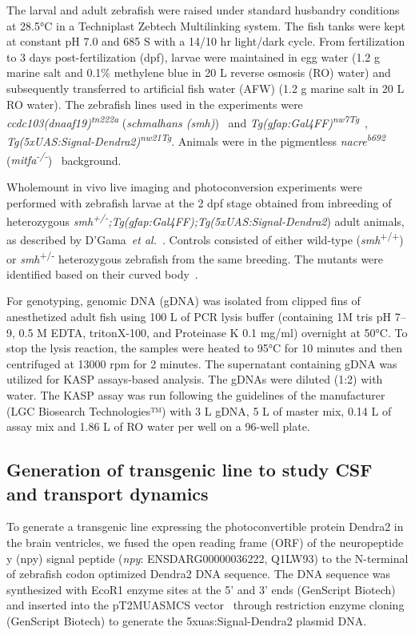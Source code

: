 \documentclass{WileyMSP-template}
\begin{document}
The larval and adult zebrafish were raised under standard husbandry
conditions at 28.5°C in a Techniplast Zebtech Multilinking system.
The fish tanks were kept at constant pH 7.0 and 685 \textmu S with a
14/10 hr light/dark cycle.
From fertilization to 3 days post-fertilization (dpf), larvae were maintained in egg
water (1.2 g marine salt and 0.1\% methylene blue in 20 L reverse osmosis (RO) water)
and subsequently transferred to artificial fish water (AFW)
(1.2 g marine salt in 20 L RO water). The zebrafish lines used in the experiments were
\emph{ccdc103(dnaaf19)\textsuperscript{tn222a}}
(\emph{schmalhans (smh)})~\cite{Jau-NianChen1997Left-rightZebrafish}
and \emph{Tg(gfap:Gal4FF)\textsuperscript{nw7Tg}}~\cite{DiazVerdugo2019Glia-neuronSeizures},
\emph{Tg(5xUAS:Signal-Dendra2)\textsuperscript{nw21Tg}}.
Animals were in the pigmentless \emph{nacre\textsuperscript{b692}}
(\emph{mitfa\textsuperscript{-/-}})~\cite{JamesA.Lister1999NacreFate} background.

Wholemount in vivo live imaging and photoconversion
experiments were performed with zebrafish larvae at the 2 dpf stage obtained from inbreeding of heterozygous
\emph{smh\textsuperscript{+/-};Tg(gfap:Gal4FF);Tg(5xUAS:Signal-Dendra2})
adult animals, as described by D'Gama~\emph{et al.}~\cite{DGama2025MotileBrain}.
Controls consisted of either wild-type (\emph{smh}\textsuperscript{+/+})
or \emph{smh}\textsuperscript{+/-} heterozygous zebrafish from the same breeding.
The mutants were identified based on their curved body~\cite{Jau-NianChen1997Left-rightZebrafish}.

For genotyping, genomic DNA (gDNA) was isolated from clipped fins of anesthetized adult
fish using 100 \textmu L of PCR lysis buffer (containing 1M tris pH 7--9, 0.5 M EDTA,
tritonX-100, and Proteinase K 0.1 mg/ml) overnight at 50°C.
To stop the lysis reaction, the samples were heated to 95°C for 10 minutes
and then centrifuged at 13000 rpm for 2 minutes.
The supernatant containing gDNA was utilized for KASP assays-based analysis.
The gDNAs were diluted (1:2) with water. 
The KASP assay was run following the guidelines of the
manufacturer (LGC Biosearch Technologies™) with 3 \textmu L gDNA,
5 \textmu L of master mix, 0.14 \textmu L of assay mix
and 1.86 \textmu L of RO water per well on a 96-well plate.

\subsection{Generation of transgenic line to study CSF and transport dynamics} 
To generate a transgenic line expressing the photoconvertible protein Dendra2 in
the brain ventricles, we fused the open reading frame (ORF)
of the neuropeptide y (npy) signal peptide
(\emph{npy}: ENSDARG00000036222, Q1LW93) to the N-terminal of
zebrafish codon optimized Dendra2 DNA sequence.
The DNA sequence was synthesized with EcoR1 enzyme sites at the 5’ and
3’ ends (GenScript Biotech) and inserted into the
pT2MUASMCS vector~\cite{Asakawa2008GeneticZebrafish}
through restriction enzyme cloning (GenScript Biotech)
to generate the 5xuas:Signal-Dendra2 plasmid DNA.
\end{document}
